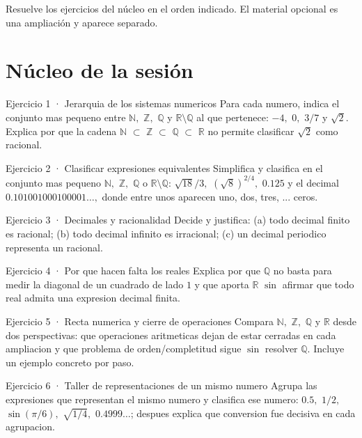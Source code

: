 \documentclass[10pt,a4paper,oneside,openany]{book}
\begin{document}
Resuelve los ejercicios del núcleo en el orden indicado. El material opcional es una ampliación y aparece separado.
\section*{Núcleo de la sesión}
\begin{PSevenExerciseFixed}{Ejercicio 1 · Jerarquia de los sistemas numericos}
Para cada numero, indica el conjunto mas pequeno entre \(\mathbb{N},\) \(\mathbb{Z},\) \(\mathbb{Q}\) y \(\mathbb{R}\setminus \mathbb{Q}\) al que pertenece: \(-4,\) \(0,\) \(3/7\) y \(\sqrt{2}\). Explica por que la cadena \(\mathbb{N}\) \(\subset \) \(\mathbb{Z}\) \(\subset \) \(\mathbb{Q}\) \(\subset \) \(\mathbb{R}\) no permite clasificar \(\sqrt{2}\) como racional.
\end{PSevenExerciseFixed}
\begin{PSevenExerciseFixed}{Ejercicio 2 · Clasificar expresiones equivalentes}
Simplifica y clasifica en el conjunto mas pequeno \(\mathbb{N},\) \(\mathbb{Z},\) \(\mathbb{Q}\) o \(\mathbb{R}\setminus \mathbb{Q}\): \(\sqrt{18}/3,\) \((\sqrt{8})^{2/4},\) \(0.125\) y el decimal \(0.101001000100001\ldots ,\) donde entre unos aparecen uno, dos, tres, ... ceros.
\end{PSevenExerciseFixed}
\begin{PSevenExerciseFixed}{Ejercicio 3 · Decimales y racionalidad}
Decide y justifica: (a) todo decimal finito es racional; (b) todo decimal infinito es irracional; (c) un decimal periodico representa un racional.
\end{PSevenExerciseFixed}
\begin{PSevenExerciseFixed}{Ejercicio 4 · Por que hacen falta los reales}
Explica por que \(\mathbb{Q}\) no basta para medir la diagonal de un cuadrado de lado \(1\) y que aporta \(\mathbb{R}\) \(\sin\) afirmar que todo real admita una expresion decimal finita.
\end{PSevenExerciseFixed}
\begin{PSevenExerciseFixed}{Ejercicio 5 · Recta numerica y cierre de operaciones}
Compara \(\mathbb{N},\) \(\mathbb{Z},\) \(\mathbb{Q}\) y \(\mathbb{R}\) desde dos perspectivas: que operaciones aritmeticas dejan de estar cerradas en cada ampliacion y que problema de orden/completitud sigue \(\sin\) resolver \(\mathbb{Q}\). Incluye un ejemplo concreto por paso.
\end{PSevenExerciseFixed}
\begin{PSevenExerciseFixed}{Ejercicio 6 · Taller de representaciones de un mismo numero}
Agrupa las expresiones que representan el mismo numero y clasifica ese numero: \(0.5,\) \(1/2,\) \(\sin(\pi /6),\) \(\sqrt{1/4},\) \(0.4999\ldots \); despues explica que conversion fue decisiva en cada agrupacion.
\end{PSevenExerciseFixed}
\end{document}
